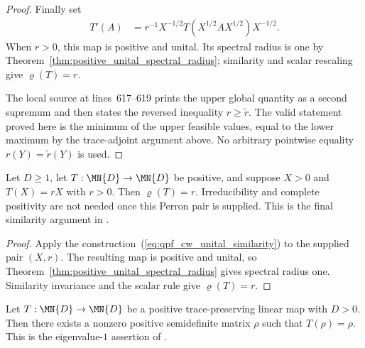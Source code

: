 \begin{proof}
    Finally set
    \begin{align}
        T'(A)
        &=r^{-1}X^{-1/2}T\!\left(X^{1/2}AX^{1/2}\right)X^{-1/2}.
        \label{eq:qpf_cw_unital_similarity}
    \end{align}
    When $r>0$, this map is positive and unital. Its spectral radius is one by
    Theorem~\ref{thm:positive_unital_spectral_radius}; similarity and scalar
    rescaling give $\varrho(T)=r$.

    The local source at lines~617--619 prints the upper global quantity as a
    second supremum and then states the reversed inequality
    $r\geq\widetilde r$. The valid statement proved here is the minimum of the
    upper feasible values, equal to the lower maximum by the trace-adjoint
    argument above. No arbitrary pointwise equality
    $r(Y)=\widetilde r(Y)$ is used.
\end{proof}

\begin{theorem}
    \label{thm:spectral_radius_pf_irred}
    \leanok
    Let $D\geq1$, let $T:\MN{D}\to\MN{D}$ be positive, and suppose
    $X>0$ and $T(X)=rX$ with $r>0$. Then $\varrho(T)=r$.
    Irreducibility and complete positivity are not needed once this Perron
    pair is supplied. This is the final similarity argument in
    \cite[Theorem~6.3(4)]{Wolf2012Quantum}.
\end{theorem}

\begin{proof}\leanok
    Apply the construction~(\ref{eq:qpf_cw_unital_similarity}) to the supplied
    pair $(X,r)$. The resulting map is positive and unital, so
    Theorem~\ref{thm:positive_unital_spectral_radius} gives spectral radius
    one. Similarity invariance and the scalar rule give $\varrho(T)=r$.
\end{proof}

\begin{theorem}
    \label{thm:eigenvalue_one_tp}
    \leanok
    Let $T:\MN{D}\to\MN{D}$ be a positive trace-preserving linear map
    with $D>0$.  Then there exists a nonzero positive semidefinite matrix
    $\rho$ such that $T(\rho)=\rho$.
    This is the eigenvalue-$1$ assertion of \cite[Proposition~6.1]{Wolf2012Quantum}.
\end{theorem}

